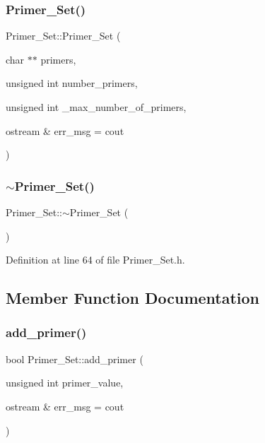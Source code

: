 \subsubsection{\texorpdfstring{Primer\+\_\+\+Set()}{Primer\_Set()}\hspace{0.1cm}{\footnotesize\ttfamily [5/5]}}
{\footnotesize\ttfamily Primer\+\_\+\+Set\+::\+Primer\+\_\+\+Set (\begin{DoxyParamCaption}\item[{char $\ast$$\ast$}]{primers,  }\item[{unsigned int}]{number\+\_\+primers,  }\item[{unsigned int}]{\+\_\+max\+\_\+number\+\_\+of\+\_\+primers,  }\item[{ostream \&}]{err\+\_\+msg = {\ttfamily cout} }\end{DoxyParamCaption})}

\mbox{\label{class_primer___set_aaeefdfa29c69f847f033b47eb43d4e05}} 
\subsubsection{\texorpdfstring{$\sim$\+Primer\+\_\+\+Set()}{~Primer\_Set()}}
{\footnotesize\ttfamily Primer\+\_\+\+Set\+::$\sim$\+Primer\+\_\+\+Set (\begin{DoxyParamCaption}{ }\end{DoxyParamCaption})}



Definition at line 64 of file Primer\+\_\+\+Set.\+h.



\subsection{Member Function Documentation}
\mbox{\label{class_primer___set_a136e11664762cb801c833209a68204fe}} 
\subsubsection{\texorpdfstring{add\+\_\+primer()}{add\_primer()}\hspace{0.1cm}{\footnotesize\ttfamily [1/2]}}
{\footnotesize\ttfamily bool Primer\+\_\+\+Set\+::add\+\_\+primer (\begin{DoxyParamCaption}\item[{unsigned int}]{primer\+\_\+value,  }\item[{ostream \&}]{err\+\_\+msg = {\ttfamily cout} }\end{DoxyParamCaption})}



